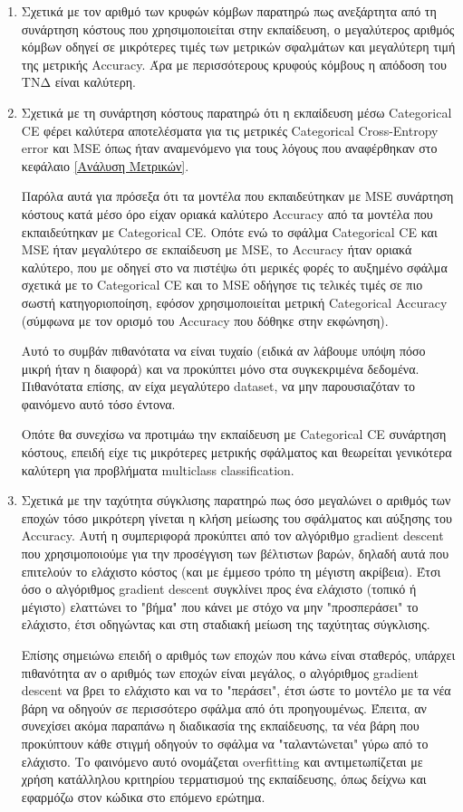 \documentclass[12pt,a4paper]{article}
\begin{document}
\begin{enumerate}
    \item Σχετικά με τον αριθμό των κρυφών κόμβων παρατηρώ πως ανεξάρτητα από τη συνάρτηση κόστους που χρησιμοποιείται στην εκπαίδευση, ο μεγαλύτερος αριθμός κόμβων οδηγεί σε μικρότερες τιμές των μετρικών σφαλμάτων και μεγαλύτερη τιμή της μετρικής Accuracy. Άρα με περισσότερους κρυφούς κόμβους η απόδοση του ΤΝΔ είναι καλύτερη.
    \item Σχετικά με τη συνάρτηση κόστους παρατηρώ ότι η εκπαίδευση μέσω Categorical CE φέρει καλύτερα αποτελέσματα για τις μετρικές Categorical Cross-Entropy error και MSE όπως ήταν αναμενόμενο για τους λόγους που αναφέρθηκαν στο κεφάλαιο \ref{Ανάλυση Μετρικών}. 

        Παρόλα αυτά για πρόσεξα ότι τα μοντέλα που εκπαιδεύτηκαν με MSE συνάρτηση κόστους κατά μέσο όρο είχαν οριακά καλύτερο Accuracy από τα μοντέλα που εκπαιδεύτηκαν με Categorical CE. Οπότε ενώ το σφάλμα Categorical CE και MSE ήταν μεγαλύτερο σε εκπαίδευση με MSE, το Accuracy ήταν οριακά καλύτερο, που με οδηγεί στο να πιστέψω ότι μερικές φορές το αυξημένο σφάλμα σχετικά με το Categorical CE και το MSE οδήγησε τις τελικές τιμές σε πιο σωστή κατηγοριοποίηση, εφόσον χρησιμοποιείται μετρική Categorical Accuracy (σύμφωνα με τον ορισμό του Accuracy που δόθηκε στην εκφώνηση). 

        Αυτό το συμβάν πιθανότατα να είναι τυχαίο (ειδικά αν λάβουμε υπόψη πόσο μικρή ήταν η διαφορά) και να προκύπτει μόνο στα συγκεκριμένα δεδομένα. Πιθανότατα επίσης, αν είχα μεγαλύτερο dataset, να μην παρουσιαζόταν το φαινόμενο αυτό τόσο έντονα.

        Οπότε θα συνεχίσω να προτιμάω την εκπαίδευση με Categorical CE συνάρτηση κόστους, επειδή είχε τις μικρότερες μετρικής σφάλματος και θεωρείται γενικότερα καλύτερη για προβλήματα multiclass classification.
    \item Σχετικά με την ταχύτητα σύγκλισης παρατηρώ πως όσο μεγαλώνει ο αριθμός των εποχών τόσο μικρότερη γίνεται η κλήση μείωσης του σφάλματος και αύξησης του Accuracy. Αυτή η συμπεριφορά προκύπτει από τον αλγόριθμο gradient descent που χρησιμοποιούμε για την προσέγγιση των βέλτιστων βαρών, δηλαδή αυτά που επιτελούν το ελάχιστο κόστος (και με έμμεσο τρόπο τη μέγιστη ακρίβεια). Έτσι όσο ο αλγόριθμος gradient descent συγκλίνει προς ένα ελάχιστο (τοπικό ή μέγιστο) ελαττώνει το "βήμα" που κάνει με στόχο να μην "προσπεράσει" το ελάχιστο, έτσι οδηγώντας και στη σταδιακή μείωση της ταχύτητας σύγκλισης.

        Επίσης σημειώνω επειδή ο αριθμός των εποχών που κάνω είναι σταθερός, υπάρχει πιθανότητα αν ο αριθμός των εποχών είναι μεγάλος, ο αλγόριθμος gradient descent να βρει το ελάχιστο και να το "περάσει", έτσι ώστε το μοντέλο με τα νέα βάρη να οδηγούν σε περισσότερο σφάλμα από ότι προηγουμένως. Έπειτα, αν συνεχίσει ακόμα παραπάνω η διαδικασία της εκπαίδευσης, τα νέα βάρη που προκύπτουν κάθε στιγμή οδηγούν το σφάλμα να "ταλαντώνεται" γύρω από το ελάχιστο. Το φαινόμενο αυτό ονομάζεται overfitting και αντιμετωπίζεται με χρήση κατάλληλου κριτηρίου τερματισμού της εκπαίδευσης, όπως δείχνω και εφαρμόζω στον κώδικα στο επόμενο ερώτημα.
        
\end{enumerate}
\end{document}
